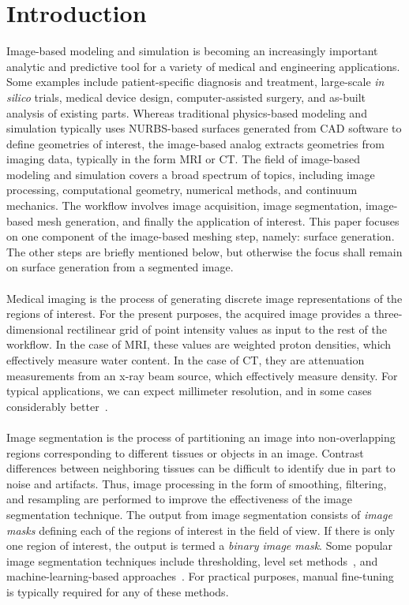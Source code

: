 \section{Introduction}

Image-based modeling and simulation is becoming an increasingly important analytic and predictive tool for a variety of medical and engineering applications. Some examples include patient-specific diagnosis and treatment, large-scale \textit{in silico} trials, medical device design, computer-assisted surgery, and as-built analysis of existing parts. Whereas traditional physics-based modeling and simulation typically uses NURBS-based surfaces generated from CAD software to define geometries of interest, the image-based analog extracts geometries from imaging data, typically in the form MRI or CT. The field of image-based modeling and simulation covers a broad spectrum of topics, including image processing, computational geometry, numerical methods, and continuum mechanics. The workflow involves image acquisition, image segmentation, image-based mesh generation, and finally the application of interest. This paper focuses on one component of the image-based meshing step, namely: surface generation. The other steps are briefly mentioned below, but otherwise the focus shall remain on surface generation from a segmented image. \\ \\
%
Medical imaging is the process of generating discrete image representations of the regions of interest. For the present purposes, the acquired image provides a three-dimensional rectilinear grid of point intensity values as input to the rest of the workflow. In the case of MRI, these values are weighted proton densities, which effectively measure water content. In the case of CT, they are attenuation measurements from an x-ray beam source, which effectively measure density. For typical applications, we can expect millimeter resolution, and in some cases considerably better~\cite{van2012super}.\\ \\
%
Image segmentation is the process of partitioning an image into non-overlapping regions corresponding to different tissues or objects in an image. Contrast differences between neighboring tissues can be difficult to identify due in part to noise and artifacts. Thus, image processing in the form of smoothing, filtering, and resampling are performed to improve the effectiveness of the image segmentation technique. The output from image segmentation consists of \textit{image masks} defining each of the regions of interest in the field of view. If there is only one region of interest, the output is termed a \textit{binary image mask}. Some popular image segmentation techniques include thresholding, level set methods~\cite{malladi_1995, sethian_1996}, and machine-learning-based approaches~\cite{litjens_2017}.  For practical purposes, manual fine-tuning is typically required for any of these methods.\\ \\
